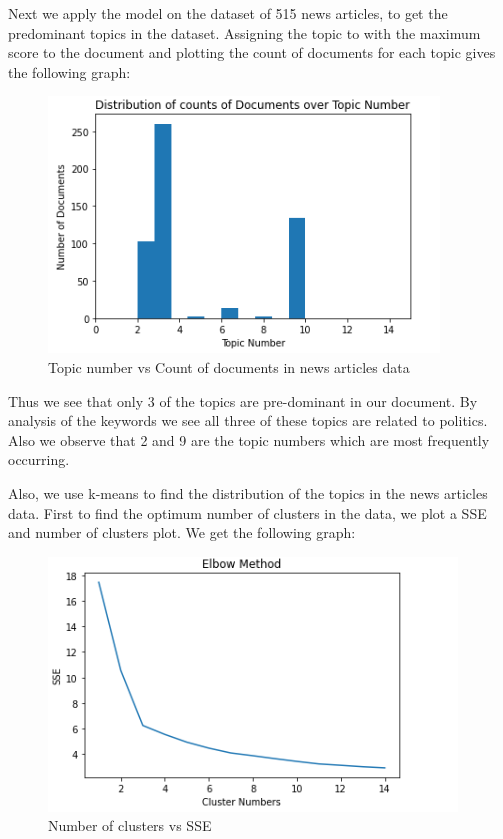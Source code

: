 \documentclass{article}
\begin{document}
Next we apply the model on the dataset of 515 news articles, to get the predominant topics in the dataset. Assigning the topic to with the maximum score to the document and plotting the count of documents for each topic gives the following graph:

\begin{figure}[H]
    \centering
    \includegraphics[scale=1]{dist.PNG}
    \caption{Topic number vs Count of documents in news articles data}
    \label{Topic number vs Count of documents in news articles data}
\end{figure}

Thus we see that only 3 of the topics are pre-dominant in our document. By analysis of the keywords we see all three of these topics are related to politics. Also we observe that 2 and 9 are the topic numbers which are most  frequently occurring. 

Also, we use k-means to find the distribution of the topics in the news articles data. First to find the optimum number of clusters in the data, we plot a SSE and number of clusters plot. We get the following graph:
\begin{figure}[H]
    \centering
    \includegraphics[scale=1]{sse.PNG}
    \caption{Number of clusters vs SSE}
    \label{Number of clusters vs SSE}
\end{figure}
\end{document}
